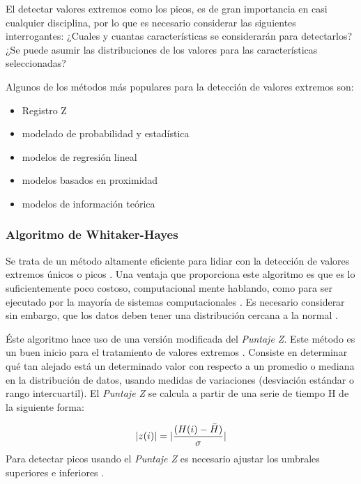 El detectar valores extremos como los picos, es de gran importancia en casi cualquier disciplina, por lo que es necesario considerar las siguientes interrogantes: ¿Cuales y cuantas características se considerarán para detectarlos?¿Se puede asumir las distribuciones de los valores para las características seleccionadas?
\vspace{1 em}

Algunos de los métodos más populares para la detección de valores extremos son:

\begin{itemize}
    \item Registro Z
    \item modelado de probabilidad y estadística
    \item modelos de regresión lineal
    \item modelos basados en proximidad
    \item modelos de información teórica
\end{itemize}

\subsubsection{Algoritmo de Whitaker-Hayes}
Se trata de un método altamente eficiente para lidiar con la detección de valores extremos únicos o picos \cite{Dealing_with_outliers}. Una ventaja que proporciona este algoritmo es que es lo suficientemente poco costoso, computacional mente hablando, como para ser ejecutado por la mayoría de sistemas computacionales \cite{WHITAKER2018}. Es necesario considerar sin embargo, que los datos deben tener una distribución cercana a la normal \cite{Dealing_with_outliers, brief_overview_outlier-detection}.
\vspace{1 em}

Éste algoritmo hace uso de una versión modificada del \emph{Puntaje Z}. Este método es un buen inicio para el tratamiento de valores extremos \cite{removing_with_Whitaker-Hayes}. Consiste en determinar qué tan alejado está un determinado valor con respecto a un promedio o mediana en la distribución de datos, usando medidas de variaciones (desviación estándar o rango intercuartil). El \emph{Puntaje Z} se calcula a partir de una serie de tiempo H de la siguiente forma:

\begin{equation}
    |z(i)| = | \frac{(H(i)-\Bar{H})}{\sigma} |
\end{equation}
Para detectar picos usando el \emph{Puntaje Z} es necesario ajustar los umbrales superiores e inferiores \cite{Dealing_with_outliers, removing_with_Whitaker-Hayes}.
\vspace{1 em}

